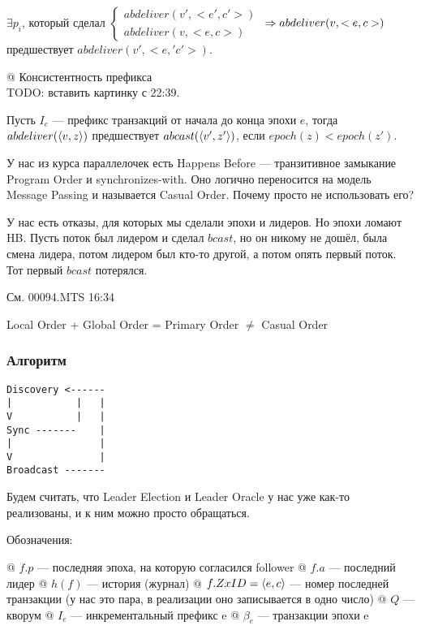 \begin{el}[ol]
\begin{el}[ol]
$\exists p_i$, который сделал $\begin{cases} abdeliver(v', <e', c'>)\\ abdeliver(v, <e, c>)\end{cases}$ $\Rightarrow abdeliver(v, <e,c>)$ предшествует  $abdeliver(v', <e,' c'>)$.
\end{el}
@ Консистентность префикса\\
TODO: вставить картинку с 22:39.

Пусть $I_e$ --- префикс транзакций от начала до конца эпохи $e$, тогда $abdeliver(\langle v, z\rangle)$ предшествует $abcast(\langle v', z'\rangle)$, если $epoch(z) < epoch(z')$.
\end{el}

\begin{note}
У нас из курса параллелочек есть Happens Before --- транзитивное замыкание Program Order и synchronizes-with. Оно логично переносится на модель Message Passing и называется Casual Order. Почему просто не использовать его?

У нас есть отказы, для которых мы сделали эпохи и лидеров. Но эпохи ломают HB. Пусть поток был лидером и сделал $bcast$, но он никому не дошёл, была смена лидера, потом лидером был кто-то другой, а потом опять первый поток. Тот первый $bcast$ потерялся.

См. 00094.MTS 16:34

Local Order + Global Order = Primary Order $\ne$ Casual Order
\end{note}



\subsubsection{Алгоритм}

\begin{verbatim}
Discovery <------
|           |   |
V           |   |
Sync -------    |
|               |
V               |
Broadcast -------
\end{verbatim}

Будем считать, что Leader Election и Leader Oracle у нас уже как-то реализованы, и к ним можно просто обращаться.

Обозначения:
\begin{el}[ul]
@ $f.p$ --- последняя эпоха, на которую согласился follower
@ $f.a$ --- последний лидер
@ $h(f)$ --- история (журнал)
@ $f.ZxID = \langle e, c\rangle$ --- номер последней транзакции (у нас это пара, в реализации оно записывается в одно число)
@ $Q$ --- кворум
@ $I_e$ --- инкрементальный префикс e
@ $\beta_e$ --- транзакции эпохи e
\end{el}


